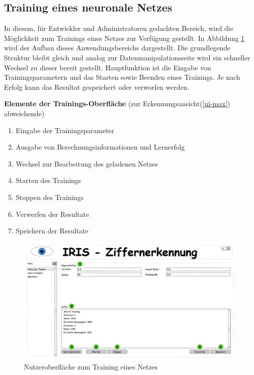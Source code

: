 \subsection{Training eines neuronale Netzes}
In diesem, für Entwickler und Administratoren gedachten Bereich, wird die Möglichkeit zum Trainings eines Netzes zur Verfügung gestellt. In Abbildung \ref{ui-train} wird der Aufbau dieses Anwendungsbereichs dargestellt. Die grundlegende Struktur bleibt gleich und analog zur Datenmanipulationsseite wird ein schneller Wechsel zu dieser bereit gestellt. Hauptfunktion ist die Eingabe von Trainingsparametern und das Starten sowie Beenden eines Trainings. Je nach Erfolg kann das Resultat gespeichert oder verworfen werden.

\textbf{Elemente der Trainings-Oberfläche} (zur Erkennungsansicht(\ref{ui-max}) abweichende)
\begin{enumerate}
\item Eingabe der Trainingsparameter
\item Ausgabe von Berechnungsinformationen und Lernerfolg
\item Wechsel zur Bearbeitung des geladenen Netzes
\item Starten des Trainings
\item Stoppen des Trainings
\item Verwerfen der Resultate
\item Speichern der Resultate
\end{enumerate}

\begin{figure}[H]
	\centering
	\includegraphics[width=1\textwidth]{Abbildungen/UI-Mocks/Train-Ui.png}
	\caption{Nutzeroberfläche zum Training eines Netzes}
	\label{ui-train}
\end{figure}

